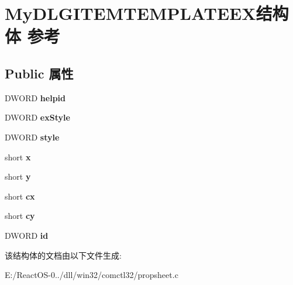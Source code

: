 \hypertarget{struct_my_d_l_g_i_t_e_m_t_e_m_p_l_a_t_e_e_x}{}\section{My\+D\+L\+G\+I\+T\+E\+M\+T\+E\+M\+P\+L\+A\+T\+E\+E\+X结构体 参考}
\label{struct_my_d_l_g_i_t_e_m_t_e_m_p_l_a_t_e_e_x}
\subsection*{Public 属性}
\begin{DoxyCompactItemize}
\item 
\mbox{\label{struct_my_d_l_g_i_t_e_m_t_e_m_p_l_a_t_e_e_x_ab93814ee2354c1333e28cf7bcbc0cc15}} 
D\+W\+O\+RD {\bfseries helpid}
\item 
\mbox{\label{struct_my_d_l_g_i_t_e_m_t_e_m_p_l_a_t_e_e_x_ac2f6ddabb20e76475a0a504710c96dd7}} 
D\+W\+O\+RD {\bfseries ex\+Style}
\item 
\mbox{\label{struct_my_d_l_g_i_t_e_m_t_e_m_p_l_a_t_e_e_x_abc8c208eedc6618db23e45763d3db68f}} 
D\+W\+O\+RD {\bfseries style}
\item 
\mbox{\label{struct_my_d_l_g_i_t_e_m_t_e_m_p_l_a_t_e_e_x_a2b2c23874f00438fda6a98355b2f7149}} 
short {\bfseries x}
\item 
\mbox{\label{struct_my_d_l_g_i_t_e_m_t_e_m_p_l_a_t_e_e_x_ab9fa7fc707965bc41c51c31fbfe63327}} 
short {\bfseries y}
\item 
\mbox{\label{struct_my_d_l_g_i_t_e_m_t_e_m_p_l_a_t_e_e_x_a2ea5835ab685b488ba29997e60ea5d20}} 
short {\bfseries cx}
\item 
\mbox{\label{struct_my_d_l_g_i_t_e_m_t_e_m_p_l_a_t_e_e_x_a32e56412d6a52aa79d63067ef0269ef7}} 
short {\bfseries cy}
\item 
\mbox{\label{struct_my_d_l_g_i_t_e_m_t_e_m_p_l_a_t_e_e_x_a3e4bc547b4fdc1d16acb11ee5eeb03a2}} 
D\+W\+O\+RD {\bfseries id}
\end{DoxyCompactItemize}


该结构体的文档由以下文件生成\+:\begin{DoxyCompactItemize}
\item 
E\+:/\+React\+O\+S-\/0../dll/win32/comctl32/propsheet.\+c\end{DoxyCompactItemize}
